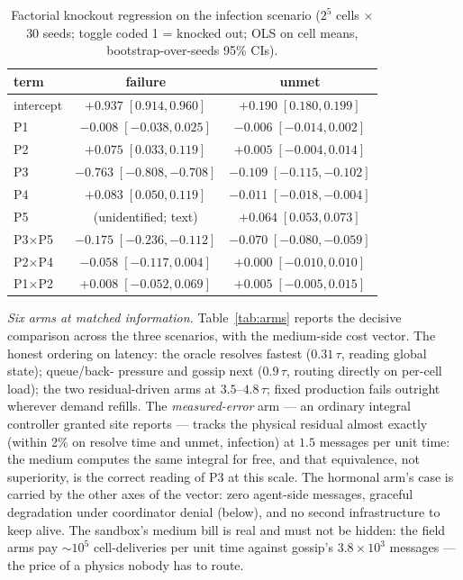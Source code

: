 \documentclass[twoside,twocolumn,usenatbib]{mnras}
\begin{document}
\begin{table}
\centering
\caption{Factorial knockout regression on the infection scenario
($2^5$ cells $\times$ 30 seeds; toggle coded 1 = knocked out; OLS on
cell means, bootstrap-over-seeds 95\% CIs).}
\label{tab:factorial}
\begin{tabular}{lcc}
\toprule
term & failure & unmet \\
\midrule
intercept & $+0.937\;[0.914, 0.960]$ & $+0.190\;[0.180, 0.199]$ \\
P1 & $-0.008\;[-0.038, 0.025]$ & $-0.006\;[-0.014, 0.002]$ \\
P2 & $+0.075\;[0.033, 0.119]$ & $+0.005\;[-0.004, 0.014]$ \\
P3 & $-0.763\;[-0.808, -0.708]$ & $-0.109\;[-0.115, -0.102]$ \\
P4 & $+0.083\;[0.050, 0.119]$ & $-0.011\;[-0.018, -0.004]$ \\
P5 & (unidentified; text) & $+0.064\;[0.053, 0.073]$ \\
P3$\times$P5 & $-0.175\;[-0.236, -0.112]$ & $-0.070\;[-0.080, -0.059]$ \\
P2$\times$P4 & $-0.058\;[-0.117, 0.004]$ & $+0.000\;[-0.010, 0.010]$ \\
P1$\times$P2 & $+0.008\;[-0.052, 0.069]$ & $+0.005\;[-0.005, 0.015]$ \\
\bottomrule
\end{tabular}
\end{table}

\emph{Six arms at matched information.}  Table~\ref{tab:arms} reports
the decisive comparison across the three scenarios, with the
medium-side cost vector.  The honest ordering on latency: the oracle
resolves fastest ($0.31\,\tau$, reading global state); queue/back-
pressure and gossip next ($0.9\,\tau$, routing directly on per-cell
load); the two residual-driven arms at $3.5$--$4.8\,\tau$; fixed
production fails outright wherever demand refills.  The
\emph{measured-error} arm --- an ordinary integral controller granted
site reports --- tracks the physical residual almost exactly (within
2\% on resolve time and unmet, infection) at $1.5$ messages per unit
time: the medium computes the same integral for free, and that
equivalence, not superiority, is the correct reading of P3 at this
scale.  The hormonal arm's case is carried by the other axes of the
vector: zero agent-side messages, graceful degradation under
coordinator denial (below), and no second infrastructure to keep
alive.  The sandbox's medium bill is real and must not be hidden: the
field arms pay $\sim\!10^5$ cell-deliveries per unit time against
gossip's $3.8\times10^3$ messages --- the price of a physics nobody
has to route.
\end{document}
